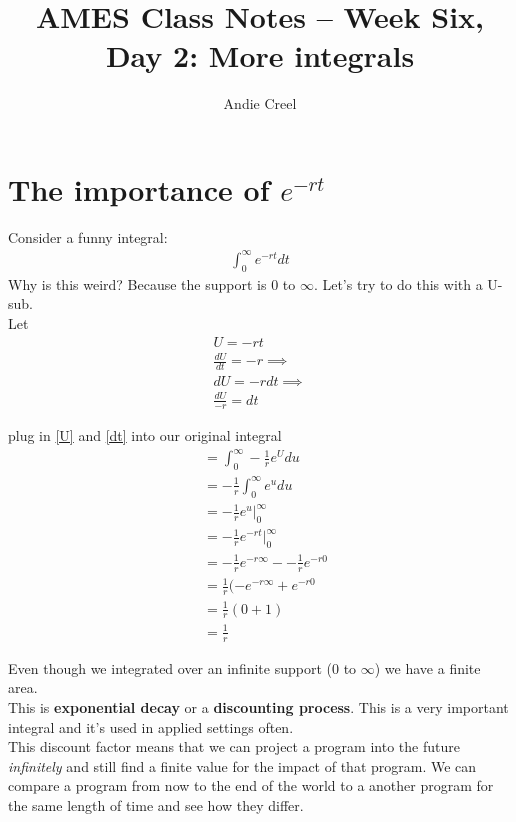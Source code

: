 \documentclass{article}
\title{AMES Class Notes -- Week Six, Day 2: More integrals}
\author{Andie Creel}
\begin{document}
\maketitle

\section{The importance of $e^{-rt}$}


Consider a funny integral: 
\begin{align}
    \int_0^\infty e^{-rt}dt
\end{align}
Why is this weird? Because the support is 0 to $\infty$. Let's try to do this with a U-sub. \\

Let 
\begin{align}
    U = -rt \label{U}\\
    \frac{dU}{dt} = -r \implies \\
    dU = -r dt \implies \\
    \frac{dU}{-r} = dt \label{dt}
\end{align}

plug in \ref{U} and \ref{dt} into our original integral 
\begin{align}
    &= \int_0^\infty - \frac{1}{r} e^U du\\
    &= -\frac{1}{r} \int_0^\infty e^u du\\
    &= -\frac{1}{r} e^u \bigg|_0^\infty \\
    &= -\frac{1}{r} e^{-rt} \bigg|_0^\infty \\
    &=  -\frac{1}{r} e^{-r\infty} - -\frac{1}{r} e^{-r 0} \\
    &= \frac{1}{r} ( -e ^{-r\infty} + e^{-r0} \\
    &= \frac{1}{r} (0 + 1) \\
    &= \frac{1}{r}
\end{align}

Even though we integrated over an infinite support (0 to $\infty$) we have a finite area. \\

This is \textbf{exponential decay} or a \textbf{discounting process}. This is a very important integral and it's used in applied settings often. \\

This discount factor means that we can project a program into the future \textit{infinitely} and still find a finite value for the impact of that program. We can compare a program from now to the end of the world to a another program for the same length of time and see how they differ. \\
\end{document}
